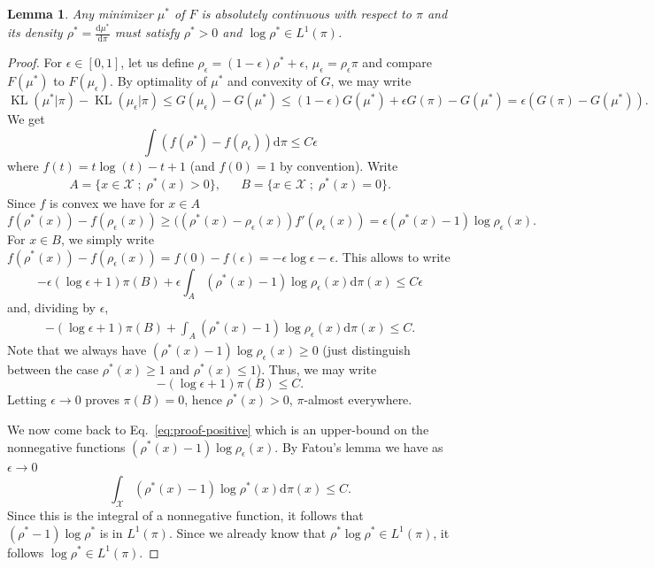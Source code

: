 \documentclass[11pt]{article}
\newcommand{\Xx}{\mathcal{X}}
\renewcommand{\d}{\mathrm{d}}
\DeclareMathOperator{\KL}{KL}
\newtheorem{lemma}[theorem]{Lemma}
\begin{document}
\begin{lemma}\label{lem:positive-minimizer}
Any minimizer $\mu^*$ of $F$ is absolutely continuous with respect to $\pi$ and its density $\rho^*=\frac{\d \mu^*}{\d \pi}$ must satisfy $\rho^*>0$ and $\log \rho^*\in L^1(\pi)$.
\end{lemma}
\begin{proof}
For $\epsilon\in [0,1]$, let us define $\rho_\epsilon = (1-\epsilon)\rho^*+\epsilon$, $\mu_\epsilon=\rho_\epsilon \pi$ and compare $F(\mu^*)$ to $F(\mu_\epsilon)$. By optimality of $\mu^*$ and convexity of $G$, we may write
$$
\KL(\mu^*|\pi)- \KL(\mu_\epsilon|\pi) \leq G(\mu_\epsilon) - G(\mu^*)\leq (1-\epsilon) G(\mu^*) +\epsilon G(\pi) - G(\mu^*) = \epsilon (G(\pi)-G(\mu^*)).
$$
We get 
$$
\int ( f(\rho^*)-f(\rho_\epsilon))\d\pi \leq C\epsilon
$$
where $f(t)=t\log(t)-t+1$ (and $f(0)=1$ by convention). Write 
\begin{align*}
A = \{x\in \Xx\;;\; \rho^*(x)>0\}, && B = \{x\in \Xx\;;\; \rho^*(x)=0\}.
\end{align*}
Since $f$ is convex we have for $x\in A$
$$
f(\rho^*(x))-f(\rho_\epsilon(x)) \geq ((\rho^*(x)-\rho_\epsilon(x))f'(\rho_\epsilon(x)) = \epsilon (\rho^*(x)-1)\log \rho_\epsilon(x).
$$
For $x\in B$, we simply write $f(\rho^*(x))-f(\rho_\epsilon(x)) =f(0)-f(\epsilon)=-\epsilon \log \epsilon -\epsilon$. This allows to write
$$
-\epsilon (\log \epsilon +1)\pi(B) +\epsilon  \int_{A} (\rho^*(x)-1)\log \rho_\epsilon(x) \d\pi(x) \leq C\epsilon
$$
and, dividing by $\epsilon$,
\begin{align}\label{eq:proof-positive}
-(\log \epsilon +1)\pi(B) +  \int_{A} (\rho^*(x)-1)\log \rho_\epsilon(x) \d\pi(x) \leq C.
\end{align}
Note that we always have $(\rho^*(x)-1)\log \rho_\epsilon(x)\geq 0$ (just distinguish between the case $\rho^*(x)\geq 1$ and $\rho^*(x)\leq 1$). Thus, we may write
$$
-(\log \epsilon +1)\pi(B) \leq C.
$$
Letting $\epsilon\to 0$ proves $\pi(B)=0$, hence $\rho^*(x)>0$, $\pi$-almost everywhere.

We now come back to Eq.~\eqref{eq:proof-positive} which is an upper-bound on the nonnegative functions $(\rho^*(x)-1)\log \rho_\epsilon(x)$. By Fatou's lemma we have as $\epsilon\to 0$
$$
\int_{\Xx} (\rho^*(x)-1)\log \rho^*(x) \d\pi(x) \leq C.
$$
Since this is the integral of a nonnegative function, it follows that $(\rho^*-1)\log \rho^*$ is in $L^1(\pi)$. Since we already know that $\rho^*\log \rho^*\in L^1(\pi)$, it follows $\log \rho^* \in L^1(\pi)$.
\end{proof}
\end{document}
